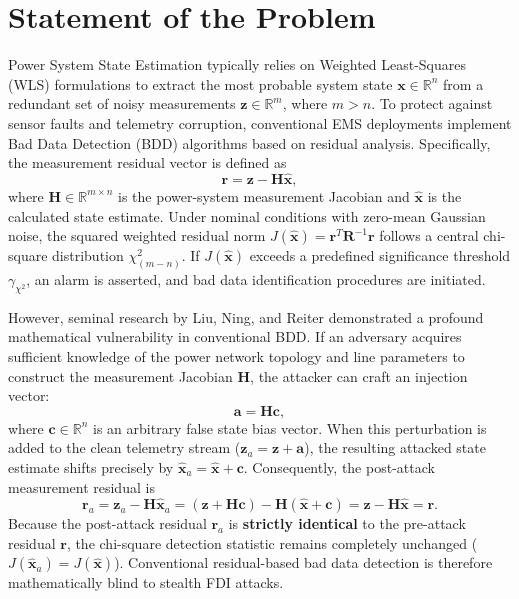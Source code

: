 \documentclass[11pt,a4paper]{report}
\begin{document}
\section{Statement of the Problem}
Power System State Estimation typically relies on Weighted Least-Squares (WLS)
formulations to extract the most probable system state $\boldsymbol{x} \in \mathbb{R}^n$
from a redundant set of noisy measurements $\boldsymbol{z} \in \mathbb{R}^m$, where
$m > n$. To protect against sensor faults and telemetry corruption, conventional
EMS deployments implement Bad Data Detection (BDD) algorithms based on residual
analysis. Specifically, the measurement residual vector is defined as
\begin{equation}
\boldsymbol{r} = \boldsymbol{z} - \boldsymbol{H}\hat{\boldsymbol{x}},
\label{eq:ch1_residual}
\end{equation}
where $\boldsymbol{H} \in \mathbb{R}^{m \times n}$ is the power-system measurement
Jacobian and $\hat{\boldsymbol{x}}$ is the calculated state estimate. Under nominal
conditions with zero-mean Gaussian noise, the squared weighted residual norm
$J(\hat{\boldsymbol{x}}) = \boldsymbol{r}^T \boldsymbol{R}^{-1} \boldsymbol{r}$
follows a central chi-square distribution $\chi^2_{(m-n)}$. If $J(\hat{\boldsymbol{x}})$
exceeds a predefined significance threshold $\gamma_{\chi^2}$, an alarm is asserted,
and bad data identification procedures are initiated.

However, seminal research by Liu, Ning, and Reiter \cite{liu2009,liu2011} demonstrated
a profound mathematical vulnerability in conventional BDD. If an adversary acquires
sufficient knowledge of the power network topology and line parameters to construct
the measurement Jacobian $\boldsymbol{H}$, the attacker can craft an injection
vector:
\begin{equation}
\boldsymbol{a} = \boldsymbol{H}\boldsymbol{c},
\label{eq:ch1_stealth}
\end{equation}
where $\boldsymbol{c} \in \mathbb{R}^n$ is an arbitrary false state bias vector. When
this perturbation is added to the clean telemetry stream ($\boldsymbol{z}_a = \boldsymbol{z} + \boldsymbol{a}$),
the resulting attacked state estimate shifts precisely by $\hat{\boldsymbol{x}}_a = \hat{\boldsymbol{x}} + \boldsymbol{c}$.
Consequently, the post-attack measurement residual is
\begin{equation}
\boldsymbol{r}_a = \boldsymbol{z}_a - \boldsymbol{H}\hat{\boldsymbol{x}}_a = (\boldsymbol{z} + \boldsymbol{H}\boldsymbol{c}) - \boldsymbol{H}(\hat{\boldsymbol{x}} + \boldsymbol{c}) = \boldsymbol{z} - \boldsymbol{H}\hat{\boldsymbol{x}} = \boldsymbol{r}.
\end{equation}
Because the post-attack residual $\boldsymbol{r}_a$ is \textbf{strictly identical}
to the pre-attack residual $\boldsymbol{r}$, the chi-square detection statistic
remains completely unchanged ($J(\hat{\boldsymbol{x}}_a) = J(\hat{\boldsymbol{x}})$).
Conventional residual-based bad data detection is therefore mathematically blind to
stealth FDI attacks.
\end{document}
